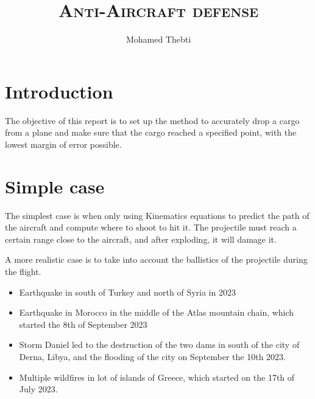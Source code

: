 \documentclass[12pt,a4paper]{article}
\title{
	\Huge\textsc{Anti-Aircraft defense}
}
\author{Mohamed Thebti}
\begin{document}
	\setlength{\parindent}{0mm}
	
	\fancyhead[R]{\slshape \leftmark}
	
	\fancyfoot[C]{}
	\fancyfoot[R]{\thepage}
	
	\maketitle
	\newpage
	
	\tableofcontents
	
	\newpage
	
	
	
	\section{Introduction}
	
	The objective of this report is to set up the method to accurately drop a cargo from a plane and make sure that the cargo reached a specified point, with the lowest margin of error possible. 
	
	
	\section{Simple case}
	
	The simplest case is when only using Kinematics equations to predict the path of the aircraft and compute where to shoot to hit it. 
	The projectile must reach a certain range close to the aircraft, and after exploding, it will damage it. 
	
	A more realistic case is to take into account the ballistics of the projectile during the flight. 
	
	
	\begin{itemize}
		\item Earthquake in south of Turkey and north of Syria in 2023
		\item Earthquake in Morocco in the middle of the Atlas mountain chain, which started the 8th of September 2023
		\item Storm Daniel led to the destruction of the two dams in south of the city of Derna, Libya, and the flooding of the city on September the 10th 2023.
		\item Multiple wildfires in lot of islands of Greece, which started on the 17th of July 2023.
	\end{itemize}
	
\end{document}
